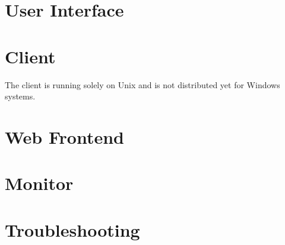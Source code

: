 \documentclass[twoside,a4paper]{refart}
\theoremstyle{dotless}
\newcounter{ex}
\begin{document}
\section{User Interface}



%



\newpage
\section{Client}
\label{client}

\clearpage

\attention The client is running solely on Unix and is not distributed yet for Windows systems.

\newpage
\section{Web Frontend}
\label{web_frontend}

\clearpage

\section{Monitor}

\section{Troubleshooting}



\begin{fullpage}
\printglossary
\end{fullpage}

\printindex
\end{document}

